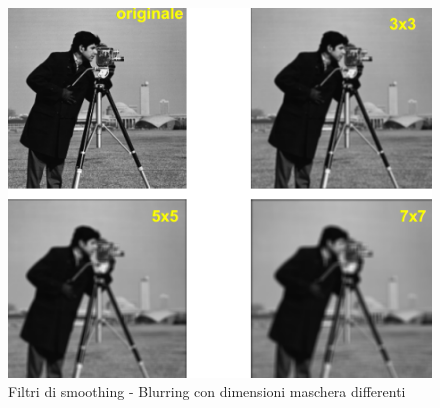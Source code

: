 \begin{figure}[!h]
\centering
\includegraphics[width=.5\textwidth]{img/blurring.png}
\caption{Filtri di smoothing - Blurring con dimensioni maschera differenti}
\label{fig:blurring}
\end{figure}

